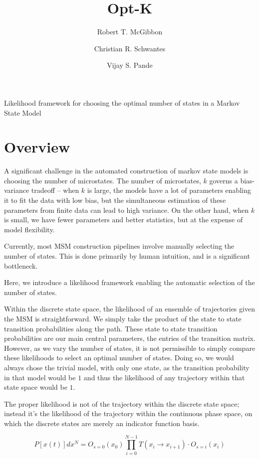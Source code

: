 \documentclass[twocolumn,floatfix,nofootinbib,aps]{revtex4-1}
\begin{document}
\title{Opt-K}
\author{Robert T. McGibbon}
\author{Christian R. Schwantes}
\author{Vijay S. Pande}
\maketitle

Likelihood framework for choosing the optimal number of states in a
Markov State Model

\section{Overview}

A significant challenge in the automated construction of markov state
models is choosing the number of microstates. The number of microstates,
$k$ governs a bias-variance tradeoff -- when $k$ is large, the models
have a lot of parameters enabling it to fit the data with low bias, but
the simultaneous estimation of these parameters from finite data can
lead to high variance. On the other hand, when $k$ is small, we have
fewer parameters and better statistics, but at the expense of model
flexibility.

Currently, most MSM construction pipelines involve manually selecting
the number of states. This is done primarily by human intuition, and is
a significant bottleneck.

Here, we introduce a likelihood framework enabling the automatic
selection of the number of states.

Within the discrete state space, the likelihood of an ensemble of
trajectories given the MSM is straightforward. We simply take the
product of the state to state transition probabilities along the path.
These state to state transition probabilities are our main central
parameters, the entries of the transition matrix. However, as we vary
the number of states, it is not permissible to simply compare these
likelihoods to select an optimal number of states. Doing so, we would
always chose the trivial model, with only one state, as the transition
probability in that model would be $1$ and thus the likelihood of any
trajectory within that state space would be $1$.

The proper likelihood is not of the trajectory within the discrete state
space; instead it's the likelihood of the trajectory within the
continuous phase space, on which the discrete states are merely an
indicator function basis.

$$
P[x(t)] dx^N = O_{s=0}(x_0) \prod_{i=0}^{N-1} T(x_i \rightarrow x_{i+1}) \cdot O_{s=i}(x_i)
$$
\end{document}
